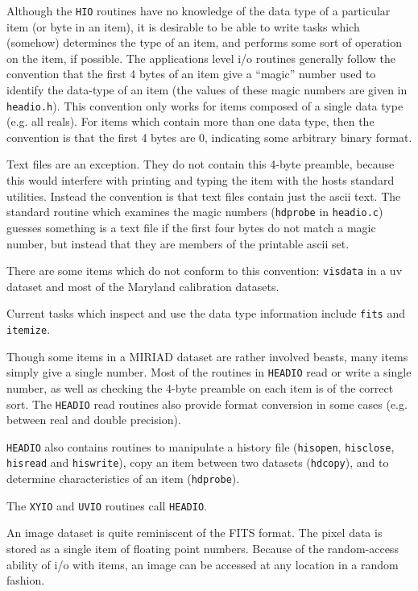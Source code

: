 Although the {\tt HIO} routines have no knowledge of the data type of a
particular item (or byte in an item), it is desirable to be able to write
tasks which (somehow) determines the type of an item, and performs some
sort of operation on the item, if possible. The applications level i/o
routines generally follow the convention that the first 4 bytes of an
item give a ``magic'' number used to identify the data-type of an item
(the values of these magic numbers are given in {\tt headio.h}).
This convention only works for items composed of a single data type
(e.g. all reals). For items which contain more than one data type, then
the convention is that the first 4 bytes are 0, indicating some arbitrary
binary format.

Text files are an exception. They do not contain this 4-byte preamble,
because this would interfere with printing and typing the item with the
hosts standard utilities. Instead the convention is that text files
contain just the ascii text. The standard routine which examines the
magic numbers ({\tt hdprobe} in {\tt headio.c}) guesses something is a
text file if the first four bytes do not match a magic number, but instead
that they are members of the printable ascii set.

There are some items which do not conform to this convention: {\tt visdata}
in a uv dataset and most of the Maryland calibration datasets.

Current tasks which inspect and use the data type information include
{\tt fits} and {\tt itemize}.


Though some items in a MIRIAD dataset are rather involved beasts, many
items simply give a single number. Most of the routines in {\tt HEADIO}
read or write a single number, as well as checking the 4-byte preamble
on each item is of the correct sort. The {\tt HEADIO} read routines also
provide format conversion in some cases (e.g. between real and double
precision).

{\tt HEADIO} also contains routines to manipulate a history file ({\tt hisopen},
{\tt hisclose}, {\tt hisread} and {\tt hiswrite}), copy an item between two
datasets ({\tt hdcopy}), and to determine characteristics of an item
({\tt hdprobe}).

The {\tt XYIO} and {\tt UVIO} routines call {\tt HEADIO}.


An image dataset is quite reminiscent of the FITS format. The pixel data
is stored as a single item of floating point numbers. Because of the
random-access ability of i/o with items, an image can be accessed at
any location in a random fashion.

